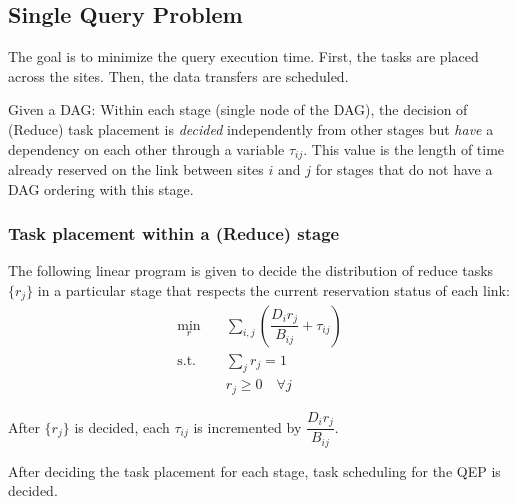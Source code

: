 \subsection{Single Query Problem}

The goal is to minimize the query execution time.
First, the tasks are placed across the sites.
Then, the data transfers are scheduled.

Given a DAG: Within each stage (single node of the DAG), the decision of (Reduce) task placement is \emph{decided} independently from other stages but \emph{have} a dependency on each other through a variable $\tau_{ij}$.
This value is the length of time already reserved on the link between sites $i$ and $j$ for stages that do not have a DAG ordering with this stage.

\subsubsection{Task placement within a (Reduce) stage}

The following linear program is given to decide the distribution of reduce tasks $\{r_j\}$ in a particular stage that respects the current reservation status of each link:
\begin{subequations}
	\begin{align}
		\min_r \quad & \sum_{i,j}\left(\dfrac{D_ir_j}{B_{ij}}+\tau_{ij}\right) \\
		\text{s.t.} \quad & \sum_jr_j=1 \\
		& r_j \geq 0 \quad\forall j
	\end{align}
\end{subequations}

After $\{r_j\}$ is decided, each $\tau_{ij}$ is incremented by $\dfrac{D_ir_j}{B_{ij}}$.


After deciding the task placement for each stage, task scheduling for the QEP is decided.

